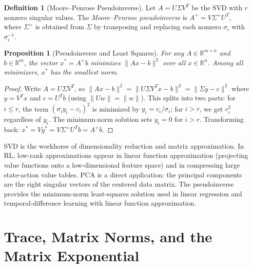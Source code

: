 \documentclass[11pt,a4paper]{article}
\theoremstyle{definition}
\newtheorem{definition}{Definition}[section]
\theoremstyle{plain}
\newtheorem{proposition}[theorem]{Proposition}
\theoremstyle{remark}
\newcommand{\R}{\mathbb{R}}
\begin{document}
\begin{definition}[Moore--Penrose Pseudoinverse]
\label{def:pseudoinverse}
Let $A = U \Sigma V^T$ be the SVD with $r$ nonzero singular values. The
\emph{Moore--Penrose pseudoinverse} is $A^+ = V \Sigma^+ U^T$, where $\Sigma^+$ is obtained
from $\Sigma$ by transposing and replacing each nonzero $\sigma_i$ with $\sigma_i^{-1}$.
\end{definition}

\begin{proposition}[Pseudoinverse and Least Squares]
\label{prop:pseudoinverse_ls}
For any $A \in \R^{m \times n}$ and $b \in \R^m$, the vector $x^* = A^+ b$ minimizes
$\|Ax - b\|^2$ over all $x \in \R^n$. Among all minimizers, $x^*$ has the smallest norm.
\end{proposition}

\begin{proof}
Write $A = U \Sigma V^T$, so $\|Ax - b\|^2 = \|U \Sigma V^T x - b\|^2 = \|\Sigma y - c\|^2$
where $y = V^T x$ and $c = U^T b$ (using $\|U w\| = \|w\|$). This splits into two parts:
for $i \leq r$, the term $(\sigma_i y_i - c_i)^2$ is minimized by $y_i = c_i / \sigma_i$;
for $i > r$, we get $c_i^2$ regardless of $y_i$. The minimum-norm solution sets $y_i = 0$
for $i > r$. Transforming back: $x^* = V y^* = V \Sigma^+ U^T b = A^+ b$.
\end{proof}

\begin{rlconnection}
SVD is the workhorse of dimensionality reduction and matrix approximation. In RL,
low-rank approximations appear in linear function approximation (projecting value functions
onto a low-dimensional feature space) and in compressing large state-action value tables.
PCA is a direct application: the principal components are the right singular vectors of the
centered data matrix. The pseudoinverse provides the minimum-norm least-squares solution used
in linear regression and temporal-difference learning with linear function approximation.
\end{rlconnection}

\section{Trace, Matrix Norms, and the Matrix Exponential}
\label{sec:matrix_norms}
\end{document}
